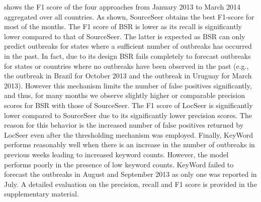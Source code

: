 \documentclass[twoside,leqno,twocolumn]{article}
\newcommand{\fullmodel}{{{\sf SourceSeer}}\xspace}
\newcommand{\locationmodel}{{\sf LocSeer}\xspace}
\newcommand{\keymodel}{{\sf KeyWord}\xspace}
\begin{document}
 shows the F1 score  of the four approaches from January 2013 to March 2014 aggregated over all countries. As shown, \fullmodel  obtains the best F1-score for most of the months. The F1 score of BSR is lower as its recall is significantly lower compared to that of \fullmodel. The latter is expected as BSR can only predict outbreaks for states where a sufficient number of outbreaks has occurred in the past. In fact, due to its design BSR fails completely to forecast outbreaks for states or countries where no outbreaks have been observed in the past (e.g., the outbreak in Brazil for October 2013 and the outbreak in Uruguay for March 2013).  However this mechanism limits the number of false positives significantly, and thus, for many months we observe slightly higher or comparable precision scores for BSR with those of \fullmodel. The F1 score of \locationmodel is significantly lower compared to \fullmodel due to its significantly lower precision scores. The reason for this behavior is the increased number of false positives returned by \locationmodel even after the thresholding mechanism was employed. Finally,  \keymodel performs reasonably well when there is an increase in the number of outbreaks in previous weeks leading to increased keyword counts. However, the model performs poorly in the presence of low keyword counts. \keymodel failed to forecast the outbreaks in August  and September 2013 as only one was reported in July. A detailed evaluation on the precision, recall and F1 score is provided in the supplementary material.
\end{document}
